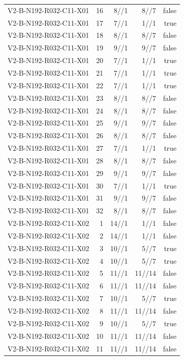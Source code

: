 {\begin{longtable}{lrrrr}
V2-B-N192-R032-C11-X01 & 16 & 8//1 & 8//7 & false \\
V2-B-N192-R032-C11-X01 & 17 & 7//1 & 1//1 & true \\
V2-B-N192-R032-C11-X01 & 18 & 8//1 & 8//7 & false \\
V2-B-N192-R032-C11-X01 & 19 & 9//1 & 9//7 & false \\
V2-B-N192-R032-C11-X01 & 20 & 7//1 & 1//1 & true \\
V2-B-N192-R032-C11-X01 & 21 & 7//1 & 1//1 & true \\
V2-B-N192-R032-C11-X01 & 22 & 7//1 & 1//1 & true \\
V2-B-N192-R032-C11-X01 & 23 & 8//1 & 8//7 & false \\
V2-B-N192-R032-C11-X01 & 24 & 8//1 & 8//7 & false \\
V2-B-N192-R032-C11-X01 & 25 & 9//1 & 9//7 & false \\
V2-B-N192-R032-C11-X01 & 26 & 8//1 & 8//7 & false \\
V2-B-N192-R032-C11-X01 & 27 & 7//1 & 1//1 & true \\
V2-B-N192-R032-C11-X01 & 28 & 8//1 & 8//7 & false \\
V2-B-N192-R032-C11-X01 & 29 & 9//1 & 9//7 & false \\
V2-B-N192-R032-C11-X01 & 30 & 7//1 & 1//1 & true \\
V2-B-N192-R032-C11-X01 & 31 & 9//1 & 9//7 & false \\
V2-B-N192-R032-C11-X01 & 32 & 8//1 & 8//7 & false \\
V2-B-N192-R032-C11-X02 & 1 & 14//1 & 1//1 & false \\
V2-B-N192-R032-C11-X02 & 2 & 14//1 & 1//1 & false \\
V2-B-N192-R032-C11-X02 & 3 & 10//1 & 5//7 & true \\
V2-B-N192-R032-C11-X02 & 4 & 10//1 & 5//7 & true \\
V2-B-N192-R032-C11-X02 & 5 & 11//1 & 11//14 & false \\
V2-B-N192-R032-C11-X02 & 6 & 11//1 & 11//14 & false \\
V2-B-N192-R032-C11-X02 & 7 & 10//1 & 5//7 & true \\
V2-B-N192-R032-C11-X02 & 8 & 11//1 & 11//14 & false \\
V2-B-N192-R032-C11-X02 & 9 & 10//1 & 5//7 & true \\
V2-B-N192-R032-C11-X02 & 10 & 11//1 & 11//14 & false \\
V2-B-N192-R032-C11-X02 & 11 & 11//1 & 11//14 & false \\

\end{longtable}}
